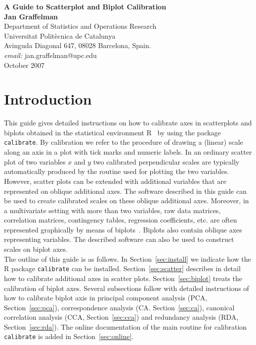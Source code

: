\documentclass[a4paper]{article}
\begin{document}
\begin{center}
\sf
{\sf \bf \Large A Guide to Scatterplot and Biplot Calibration}\\
\vspace{4mm}
{\bf \large Jan Graffelman}\\
\vspace{4mm} \rm \large
Department of Statistics and Operations Research\\
Universitat Polit\`ecnica de Catalunya\\
Avinguda Diagonal 647, 08028 Barcelona, Spain.\\
{\it email:} jan.graffelman@upc.edu\\
\vspace{4mm}
{\sc October 2007}
\end{center}

\section{Introduction}

This guide gives detailed instructions on how to calibrate axes in scatterplots
and biplots obtained in the statistical environment R~\cite{RRR} by using the package
{\tt calibrate}. By calibration we 
refer to the procedure of drawing a (linear) scale along an axis in a plot with 
tick marks and numeric labels. In an ordinary scatter plot of two variables $x$ and $y$ 
two calibrated perpendicular scales are typically automatically produced by the 
routine used for plotting the two variables. However, scatter plots can be
extended with additional variables that are represented on oblique additional
axes. The software described in this guide can be used to create calibrated
scales on these oblique additional axes. Moreover, in a multivariate setting with more
than two variables, raw data matrices, correlation matrices, contingency tables,
regression coefficients, etc. are often represented graphically by means of biplots~\cite{Gabriel}. Biplots
also contain oblique axes representing variables. The described software can also be
used to construct scales on biplot axes.\\

The outline of this guide is as follows. In Section~\ref{sec:install} we indicate how the 
R package {\tt calibrate} can be installed. Section~\ref{sec:scatter} describes in detail
how to calibrate additional axes in scatter plots. Section~\ref{sec:biplot} treats the 
calibration of biplot axes. Several subsections follow with detailed
instructions of how to calibrate biplot axis in principal component analysis
(PCA, Section~\ref{sec:pca}), correspondence analysis (CA. Section~\ref{sec:ca}), 
canonical correlation analysis (CCA, Section~\ref{sec:cca}) and redundancy analysis (RDA, Section~\ref{sec:rda}). 
The online documentation of the main routine for calibration {\tt calibrate} is added in 
Section~\ref{sec:online}.\\
\end{document}
